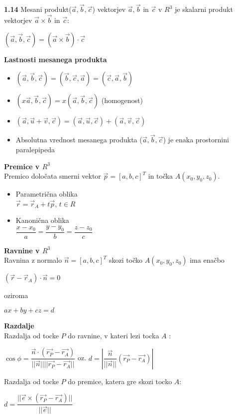 \documentclass{article}
\begin{document}
\begin{multicols}{2}
\textbf{1.14} Mesani produkt($\vec{a}, \vec{b}, \vec{c}$) vektorjev
$\vec{a}, \vec{b}$ in $\vec{c}$ v $R^{3}$ je skalarni produkt vektorjev
$\vec{a} \times \vec{b}$ in $\vec{c}$:
\begin{center}
    $(\vec{a}, \vec{b}, \vec{c}) = (\vec{a} \times \vec{b})\cdot \vec{c}$
\end{center}

\textbf{Lastnosti mesanega produkta}
\begin{itemize}
    \item $(\vec{a}, \vec{b}, \vec{c}) = (\vec{b}, \vec{c}, \vec{a}) = (\vec{c}, \vec{a}, \vec{b})$
    \item $(x\vec{a}, \vec{b}, \vec{c}) = x(\vec{a}, \vec{b}, \vec{c})$ (homogenost)
    \item $(\vec{a}, \vec{u} + \vec{v}, \vec{c}) = (\vec{a}, \vec{u}, \vec{c}) + (\vec{a}, \vec{v}, \vec{c})$
    \item Absolutna vrednost mesanega produkta ($\vec{a}, \vec{b}, \vec{c}$) je enaka prostornini paralepipeda
\end{itemize}
    
\textbf{Premice v $R^{3}$} \\
Premico določata smerni vektor $\vec{p} = [a, b, c]^{T}$ in točka $A(x_0, y_0, z_0)$.
\begin{itemize}
    \item Parametrična oblika\\
        $\vec{r} = \vec{r}_{A} + t\vec{p}$, $t \in R$
    \vfill\null
    \columnbreak
    \item Kanonična oblika\\
        $\dfrac{x - x_{0}}{a} = \dfrac{y - y_{0}}{b} = \dfrac{z - z_{0}}{c}$
\end{itemize}

\textbf{Ravnine v $R^{3}$} \\
Ravnina z normalo $\vec{n} = [a, b, c]^T$ skozi točko $A(x_0, y_0, z_0)$ ima enačbo
\begin{center}
    $(\vec{r} - \vec{r}_A) \cdot \vec{n} = 0$
\end{center}
oziroma
\begin{center}
    $ax + by + cz = d$
\end{center}

\textbf{Razdalje}\\
Razdalja od tocke $P$ do ravnine, v kateri lezi tocka $A$ :
\begin{center}
    $\cos\phi = \dfrac{\vec{n} \cdot ( \vec{r_{P}} - \vec{r_{A}})} {||\vec{n}|| ||\vec{r_{P}} - \vec{r_{A}}||}$ oz.
    $d = |\dfrac{\vec{n}}{||\vec{n}||} ( \vec{r_{P}} - \vec{r_{A}})|$
\end{center}
Razdalja od tocke $P$ do premice, katera gre skozi tocko $A$:
\begin{center}
    $d = \dfrac{||\vec{e} \times ( \vec{r_{P}} - \vec{r_{A}})||}{||\vec{e}||}$
\end{center}


\end{multicols}
\end{document}
